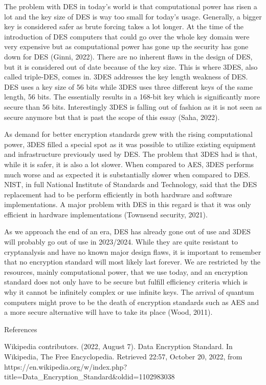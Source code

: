 \documentclass[11pt]{article}
\begin{document}
The problem with DES in today's world is that computational power has
risen a lot and the key size of DES is way too small for today's usage.
Generally, a bigger key is considered safer as brute forcing takes a lot
longer. At the time of the introduction of DES computers that could go
over the whole key domain were very expensive but as computational power
has gone up the security has gone down for DES (Ginni, 2022). There are
no inherent flaws in the design of DES, but it is considered out of date
because of the key size. This is where 3DES, also called triple-DES,
comes in. 3DES addresses the key length weakness of DES. DES uses a key
size of 56 bits while 3DES uses three different keys of the same length,
56 bits. The essentially results in a 168-bit key which is significantly
more secure than 56 bits. Interestingly 3DES is falling out of fashion
as it is not seen as secure anymore but that is past the scope of this
essay (Saha, 2022).

As demand for better encryption standards grew with the rising
computational power, 3DES filled a special spot as it was possible to
utilize existing equipment and infrastructure previously used by DES.
The problem that 3DES had is that, while it is safer, it is also a lot
slower. When compared to AES, 3DES performs much worse and as expected
it is substantially slower when compared to DES. NIST, in full National
Institute of Standards and Technology, said that the DES replacement had
to be perform efficiently in both hardware and software implementations.
A major problem with DES in this regard is that it was only efficient in
hardware implementations (Townsend security, 2021).

As we approach the end of an era, DES has already gone out of use and
3DES will probably go out of use in 2023/2024. While they are quite
resistant to cryptanalysis and have no known major design flaws, it is
important to remember that no encryption standard will most likely last
forever. We are restricted by the resources, mainly computational power,
that we use today, and an encryption standard does not only have to be
secure but fulfill efficiency criteria which is why it cannot be
infinitely complex or use infinite keys. The arrival of quantum
computers might prove to be the death of encryption standards such as
AES and a more secure alternative will have to take its place (Wood,
2011).  

References

Wikipedia contributors. (2022, August 7). Data Encryption Standard. In
Wikipedia, The Free Encyclopedia. Retrieved 22:57, October 20, 2022,
from
https://en.wikipedia.org/w/index.php?title=Data\_Encryption\_Standard\&oldid=1102983038
\end{document}
